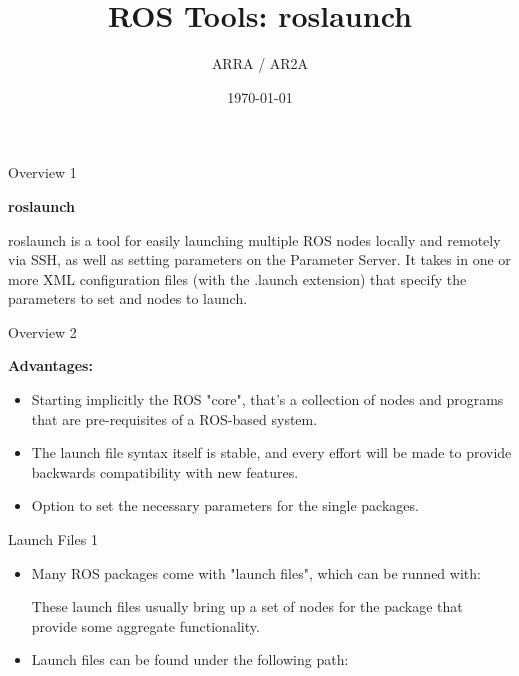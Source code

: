 \documentclass{beamer}
\title[]{ROS Tools: roslaunch} %
\author{ARRA / AR2A} %
\institute %
{
\textbf{A}dvancements for \textbf{R}obotics in \textbf{R}escue \textbf{A}pplications
}
\date{\today} %
\begin{document}
\begin{frame}
\titlepage %
\end{frame}
\begin{frame}{Overview 1}
\begin{large}
	\textbf{roslaunch} \newline \newline
\end{large}
roslaunch is a tool for easily launching multiple ROS nodes locally and remotely via SSH, as well as setting parameters on the Parameter Server. \newline \newline
It takes in one or more XML configuration files (with the .launch extension) that specify the parameters to set and nodes to launch.
\end{frame}
\begin{frame}{Overview 2}
	\begin{large}
		\textbf{Advantages:} \newline
	\end{large}
\begin{itemize}
	\item Starting implicitly the ROS "core", that's a collection of nodes and programs that are pre-requisites of a ROS-based system.
	\newline
	\item The launch file syntax itself is stable, and every effort will be made to provide backwards compatibility with new features. 
	\newline
	\item Option to set the necessary parameters for the single packages. 
\end{itemize}
\end{frame}
\begin{frame}{Launch Files 1}
\begin{itemize}
 \item Many ROS packages come with "launch files", which can be runned with:
 \vspace{10px}
 
 \vspace{10px}
 These launch files usually bring up a set of nodes for the package that provide some aggregate functionality. 
\end{itemize}
\begin{itemize}
 \item Launch files can be found under the following path:
 \vspace{10px}
  
\end{itemize}
\end{frame}
\end{document}
